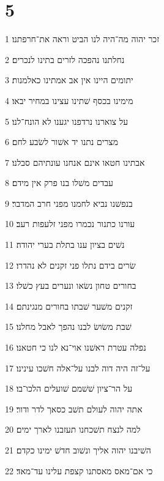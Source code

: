 \chapter{5}

\par 1 זכר יהוה מה־היה לנו הביט וראה את־חרפתנו׃
\par 2 נחלתנו נהפכה לזרים בתינו לנכרים׃
\par 3 יתומים היינו אין אב אמתינו כאלמנות׃
\par 4 מימינו בכסף שׁתינו עצינו במחיר יבאו׃
\par 5 על צוארנו נרדפנו יגענו לא הונח־לנו׃
\par 6 מצרים נתנו יד אשׁור לשׂבע לחם׃
\par 7 אבתינו חטאו אינם אנחנו עונתיהם סבלנו׃
\par 8 עבדים משׁלו בנו פרק אין מידם׃
\par 9 בנפשׁנו נביא לחמנו מפני חרב המדבר׃
\par 10 עורנו כתנור נכמרו מפני זלעפות רעב׃
\par 11 נשׁים בציון ענו בתלת בערי יהודה׃
\par 12 שׂרים בידם נתלו פני זקנים לא נהדרו׃
\par 13 בחורים טחון נשׂאו ונערים בעץ כשׁלו׃
\par 14 זקנים משׁער שׁבתו בחורים מנגינתם׃
\par 15 שׁבת משׂושׂ לבנו נהפך לאבל מחלנו׃
\par 16 נפלה עטרת ראשׁנו אוי־נא לנו כי חטאנו׃
\par 17 על־זה היה דוה לבנו על־אלה חשׁכו עינינו׃
\par 18 על הר־ציון שׁשׁמם שׁועלים הלכו־בו׃
\par 19 אתה יהוה לעולם תשׁב כסאך לדר ודור׃
\par 20 למה לנצח תשׁכחנו תעזבנו לארך ימים׃
\par 21 השׁיבנו יהוה אליך ונשׁוב חדשׁ ימינו כקדם׃
\par 22 כי אם־מאס מאסתנו קצפת עלינו עד־מאד׃


